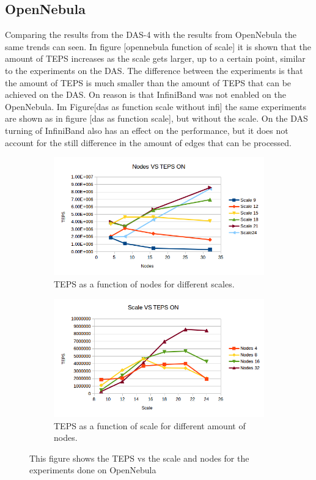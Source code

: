 \subsection{OpenNebula}

Comparing the results from the DAS-4 with the results from OpenNebula the same trends can seen. In figure [opennebula function of scale] it is shown that the amount of TEPS increases as the scale gets larger, up to a certain point, similar to the experiments on the DAS. The difference between the experiments is that the amount of TEPS is much smaller than the amount of TEPS that can be achieved on the DAS. On reason is that InfiniBand was not enabled on the OpenNebula. Im Figure[das as function scale without infi] the same experiments are shown as in  figure [das as function scale], but without the scale. On the DAS turning of  InfiniBand also has an effect on the performance, but it does not account for the still difference in the amount of edges that can be processed.

\begin{figure}[!h]
\centering
\begin{subfigure}{.5\textwidth}
  \centering
  \includegraphics[width=\linewidth]{images/nodes_opennebula.png}
  \caption{TEPS as a function of nodes for different scales.}
  \label{fig:nodes_opennebula}
\end{subfigure}%
\begin{subfigure}{.5\textwidth}
  \centering
  \includegraphics[width=\linewidth]{images/scale_opennebula.png}
  \caption{TEPS as a function of scale for different amount of nodes.}
  \label{fig:scale_opennebula}
\end{subfigure}
\caption{This figure shows the TEPS vs the scale and nodes for the experiments done on OpenNebula}
\label{fig:das_opennebula}
\end{figure}

